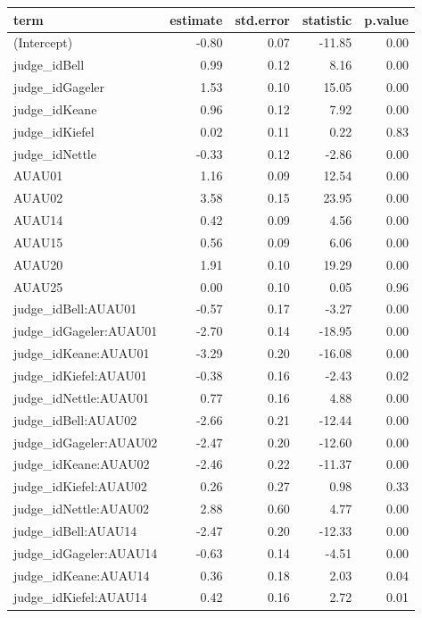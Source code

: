 \documentclass{monashthesis}
\begin{document}
\begin{tabular}{l|r|r|r|r}
\hline
term & estimate & std.error & statistic & p.value\\
\hline
(Intercept) & -0.80 & 0.07 & -11.85 & 0.00\\
\hline
judge\_idBell & 0.99 & 0.12 & 8.16 & 0.00\\
\hline
judge\_idGageler & 1.53 & 0.10 & 15.05 & 0.00\\
\hline
judge\_idKeane & 0.96 & 0.12 & 7.92 & 0.00\\
\hline
judge\_idKiefel & 0.02 & 0.11 & 0.22 & 0.83\\
\hline
judge\_idNettle & -0.33 & 0.12 & -2.86 & 0.00\\
\hline
AUAU01 & 1.16 & 0.09 & 12.54 & 0.00\\
\hline
AUAU02 & 3.58 & 0.15 & 23.95 & 0.00\\
\hline
AUAU14 & 0.42 & 0.09 & 4.56 & 0.00\\
\hline
AUAU15 & 0.56 & 0.09 & 6.06 & 0.00\\
\hline
AUAU20 & 1.91 & 0.10 & 19.29 & 0.00\\
\hline
AUAU25 & 0.00 & 0.10 & 0.05 & 0.96\\
\hline
judge\_idBell:AUAU01 & -0.57 & 0.17 & -3.27 & 0.00\\
\hline
judge\_idGageler:AUAU01 & -2.70 & 0.14 & -18.95 & 0.00\\
\hline
judge\_idKeane:AUAU01 & -3.29 & 0.20 & -16.08 & 0.00\\
\hline
judge\_idKiefel:AUAU01 & -0.38 & 0.16 & -2.43 & 0.02\\
\hline
judge\_idNettle:AUAU01 & 0.77 & 0.16 & 4.88 & 0.00\\
\hline
judge\_idBell:AUAU02 & -2.66 & 0.21 & -12.44 & 0.00\\
\hline
judge\_idGageler:AUAU02 & -2.47 & 0.20 & -12.60 & 0.00\\
\hline
judge\_idKeane:AUAU02 & -2.46 & 0.22 & -11.37 & 0.00\\
\hline
judge\_idKiefel:AUAU02 & 0.26 & 0.27 & 0.98 & 0.33\\
\hline
judge\_idNettle:AUAU02 & 2.88 & 0.60 & 4.77 & 0.00\\
\hline
judge\_idBell:AUAU14 & -2.47 & 0.20 & -12.33 & 0.00\\
\hline
judge\_idGageler:AUAU14 & -0.63 & 0.14 & -4.51 & 0.00\\
\hline
judge\_idKeane:AUAU14 & 0.36 & 0.18 & 2.03 & 0.04\\
\hline
judge\_idKiefel:AUAU14 & 0.42 & 0.16 & 2.72 & 0.01\\

\end{tabular}
\end{document}
